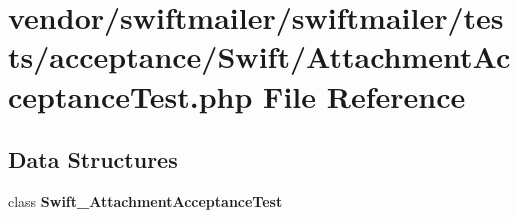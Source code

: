 \section{vendor/swiftmailer/swiftmailer/tests/acceptance/\+Swift/\+Attachment\+Acceptance\+Test.php File Reference}
\label{_attachment_acceptance_test_8php}
\subsection*{Data Structures}
\begin{DoxyCompactItemize}
\item 
class {\bf Swift\+\_\+\+Attachment\+Acceptance\+Test}
\end{DoxyCompactItemize}
